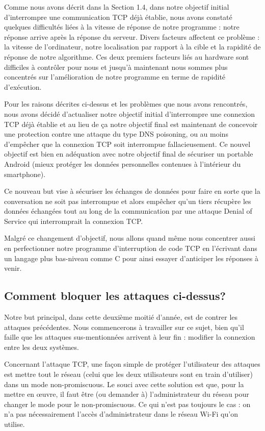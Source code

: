 \documentclass[a4paper, 12pt,twoside]{article}
\begin{document}
	Comme nous avons décrit dans la Section 1.4,  dans notre objectif initial d'interrompre une communication TCP déjà établie, nous avons constaté quelques difficultés liées à la vitesse de réponse de notre programme : notre réponse arrive après la réponse du serveur. Divers facteurs affectent ce problème : la vitesse de l’ordinateur, notre localisation par rapport à la cible et la rapidité de réponse de notre algorithme. Ces deux premiers facteurs liés au hardware sont difficiles à contrôler pour nous et jusqu'à maintenant nous sommes plus concentrés sur l'amélioration de notre programme en terme de rapidité d'exécution.

	Pour les raisons décrites ci-dessus et les problèmes que nous avons rencontrés, nous avons décidé d’actualiser notre objectif initial d'interrompre une connexion TCP déjà établie et au lieu de ça notre objectif final est maintenant de concevoir une protection contre une attaque du type DNS poisoning, ou au moins d'empêcher que la connexion TCP soit interrompue fallacieusement. Ce nouvel objectif est bien en adéquation avec notre objectif final de sécuriser un portable Android (mieux protéger les données personnelles contenues à l’intérieur du smartphone).

	Ce nouveau but vise à sécuriser les échanges de données pour faire en sorte que la conversation ne soit pas interrompue et alors empêcher qu’un tiers récupère les données échangées tout au long de la communication par une attaque Denial of Service qui interromprait la connexion TCP.

	Malgré ce changement d’objectif, nous allons quand même nous concentrer aussi en perfectionner notre programme d’interruption de code TCP en l’écrivant dans un langage plus bas-niveau comme C pour ainsi essayer d’anticiper les réponses à venir.
	
	\subsection{Comment bloquer les attaques ci-dessus?}

	Notre but principal, dans cette deuxième moitié d'année, est de contrer les attaques précédentes. Nous commencerons à travailler sur ce sujet, bien qu'il faille que les attaques sus-mentionnées arrivent à leur fin : modifier la connexion entre les deux systèmes.

	Concernant l’attaque TCP, une façon simple de protéger l’utilisateur des attaques est mettre tout le réseau (celui que les deux utilisateurs sont en train d’utiliser) dans un mode non-promiscuous. Le souci avec cette solution est que, pour la mettre en \oe{}uvre, il faut être (ou demander à) l'administrateur du réseau pour changer le mode pour le non-promiscuous. Ce qui n’est pas toujours le cas : on n’a pas nécessairement l'accès d’administrateur dans le réseau Wi-Fi qu’on utilise.
\end{document}
